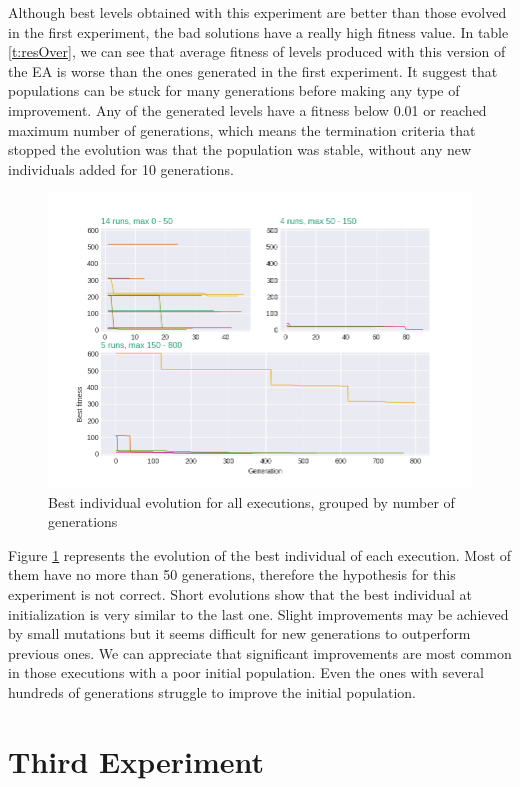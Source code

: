 Although best levels obtained with this experiment are better than those evolved in the first experiment, the bad solutions have a really high fitness value. In table \ref{t:resOver}, we can see that average fitness of levels produced with this version of the \acs{EA} is worse than the ones generated in the first experiment. It suggest that populations can be stuck for many generations before making any type of improvement. Any of the generated levels have a fitness below 0.01 or reached maximum number of generations, which means the termination criteria that stopped the evolution was that the population was stable, without any new individuals added for 10 generations. 
\begin{figure}[H]
	\centering
	\includegraphics[scale=0.5]{gfx/exp2_explication.png}
	\caption{Best individual evolution for all executions, grouped by number of generations}\label{f:grahp2}
\end{figure}
Figure \ref{f:grahp2} represents the evolution of the best individual of each execution. Most of them have no more than 50 generations, therefore the hypothesis for this experiment is not correct. Short evolutions show that the best individual at initialization is very similar to the last one. Slight improvements may be achieved by small mutations but it seems difficult for new generations to outperform previous ones. We can appreciate that significant improvements are most common in those executions with a poor initial population. Even the ones with several hundreds of generations struggle to improve the initial population.

\section{Third Experiment}
